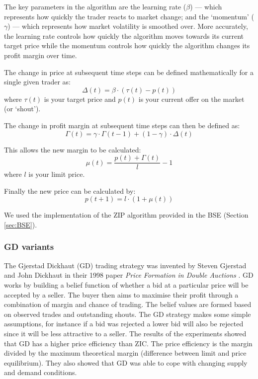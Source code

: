 \documentclass[preprint]{acm_proc_article-sp} %
\begin{document}
The key parameters in the algorithm are the learning rate ($\beta$) --- which represents how quickly 
the trader reacts to market change; and the `momentum' ($\gamma$) --- which represents how market 
volatility is smoothed over. More accurately, the learning rate controls how quickly the algorithm 
moves towards its current target price while the momentum controls how quickly the algorithm changes 
its profit margin over time.

The change in price at subsequent time steps can be defined mathematically for a single given trader as:
\begin{equation}
    \Delta(t) = \beta \cdot ( \tau(t) - p(t))
    \label{eqn:change_in_price}
\end{equation}
where $\tau(t)$ is your target price and $p(t)$ is your current offer on the market (or `shout').

The change in profit margin at subsequent time steps can then be defined as:
\begin{equation}
    \Gamma(t) = \gamma \cdot \Gamma(t-1) + (1 - \gamma) \cdot \Delta(t)
    \label{eqn:change_in_margin}
\end{equation}

This allows the new margin to be calculated:
\begin{equation}
    \mu(t) = \frac{p(t) + \Gamma(t)}{l} - 1
    \label{eqn:new_margin}
\end{equation}
where $l$ is your limit price.

Finally the new price can be calculated by:
\begin{equation}
    p(t+1) = l \cdot (1 + \mu(t))
    \label{eqn:new_price}
\end{equation}

We used the implementation of the ZIP algorithm provided in the BSE (Section \ref{sec:BSE}).\\



\subsubsection{GD variants} \label{sec:traders_GDV}

The Gjerstad Dickhaut (GD) trading strategy was invented by Steven Gjerstad and John Dickhaut in 
their 1998 paper \emph{Price Formation in Double Auctions} \cite{gd}.
GD works by building a belief function of whether a bid at a particular price
will be accepted by a seller.
The buyer then aims to maximise their profit through a combination of margin
and chance of trading.
The belief values are formed based on observed trades and outstanding shouts.
The GD strategy makes some simple assumptions, for instance if a bid was rejected a
lower bid will also be rejected since it will be less attractive to a seller.
The results of the experiments showed that GD has a higher price efficiency than ZIC.
The price efficiency is the margin divided by the maximum theoretical margin
(difference between limit and price equilibrium).
They also showed that GD was able to cope with changing supply and demand
conditions.
\end{document}
